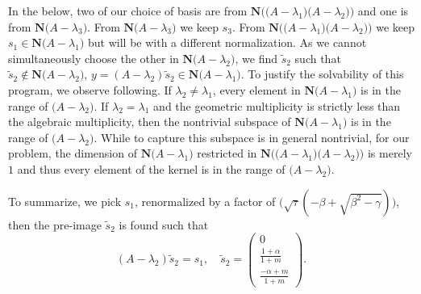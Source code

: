 \documentclass[a4paper,11pt]{article}
\theoremstyle{remark}
\begin{document}
In the below, two of our choice of basis are from $\mathbf{N}\Big(\big(A -\lambda_1\big)\big(A - \lambda_2\big)\Big)$ and one is from $\mathbf{N}\Big(A - \lambda_3\Big)$. From $\mathbf{N}\Big(A - \lambda_3\Big)$ we keep $s_3$. From $\mathbf{N}\Big(\big(A -\lambda_1\big)\big(A - \lambda_2\big)\Big)$ we keep $s_1\in\mathbf{N}\Big(A - \lambda_1\Big)$ but will be with a different normalization. As we cannot simultaneously choose the other in $\mathbf{N}\Big(A - \lambda_2\Big)$, we find $\tilde s_2$ such that $\tilde s_2\notin\mathbf{N}\Big(A - \lambda_2\Big)$, $y = (A-\lambda_2)\tilde s_2 \in \mathbf{N}\Big(A - \lambda_1\Big)$. To justify the solvability of this program, we observe following. If $\lambda_2\ne\lambda_1$, every element in $\mathbf{N}\Big(A - \lambda_1\Big)$ is in the range of $(A - \lambda_2\big)$. If $\lambda_2=\lambda_1$ and the geometric multiplicity is strictly less than the algebraic multiplicity, then the nontrivial subspace of $\mathbf{N}\Big(A - \lambda_1\Big)$ is in the range of $(A - \lambda_2\big)$. While to capture this subspace is in general nontrivial, for our problem, the dimension of $\mathbf{N}\Big(A - \lambda_1\Big)$ restricted in $\mathbf{N}\Big(\big(A -\lambda_1\big)\big(A - \lambda_2\big)\Big)$ is merely $1$ and thus every element of the kernel is in the range of $(A - \lambda_2\big)$. 

To summarize, we pick $s_1$, renormalized by a factor of $\Big(\sqrt{\tau}(-\beta+\sqrt{\beta^2-\gamma})\Big)$, then the pre-image $\tilde s_2$ is found such that
$$ (A-\lambda_2) \tilde s_2 = s_1, \quad \text{$\tilde s_2 = \begin{pmatrix}  0 \\ \tfrac{1+\alpha}{1+m} \\ \tfrac{-\alpha+m}{1+m} \end{pmatrix}$}.$$
\end{document}
